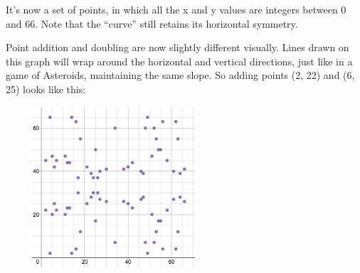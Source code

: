 \begin{flushleft}
It’s now a set of points, in which all the x and y values are integers between 0 and 66. Note that the “curve” still retains its horizontal symmetry.

Point addition and doubling are now slightly different visually. Lines drawn on this graph will wrap around the horizontal and vertical directions, just like in a game of Asteroids, maintaining the same slope. So adding points (2, 22) and (6, 25) looks like this:
\end{flushleft}

\centering\includegraphics[width=8cm, height=6cm]{charts/4.png}

